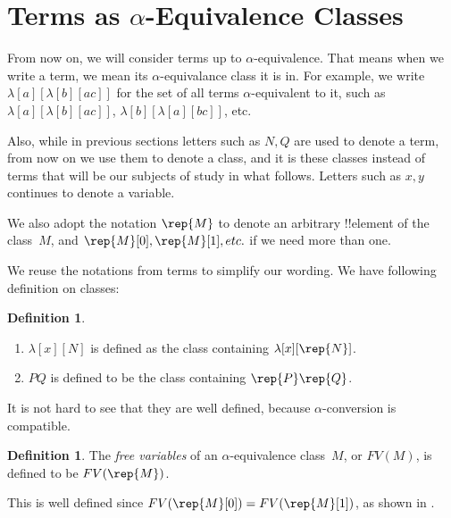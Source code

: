 \documentclass[10pt,a4paper]{article}
\makeatletter
\theoremstyle{plain}
\theoremstyle{definition}
\newtheorem{defn}[thm]{Definition}
\theoremstyle{remark}
\newcommand*{\olfileid}[3]{}
\newcommand*{\olsection}[1]{\section*{#1}}
\newcommand*{\olimport}[1]{}
\newcommand*{\ollabel}[1]{\label{#1}}
\newcommand{\olref}{\@ifnextchar[{\olref@i}{\olref@final}}
\def\olref@i[#1]{\@ifnextchar[{\olref@ii}{\olref@final}}
\def\olref@ii[#1]{\@ifnextchar[{\olref@iii}{\olref@final}}
\def\olref@iii[#1]{\olref@final}
\def\olref@final#1{\ref{#1}}
\providecommand{\lambd}{\ensuremath{\lambda}}
\makeatother
\begin{document}
\olimport{de-bruijn}

\olimport{term-revisited}

\olimport{beta}

\olimport{eta}

\OLEndChapterHook





\olfileid{lam}{syn}{tr}
\olsection{Terms as $\alpha$-Equivalence Classes}

From now on, we will consider terms up to $\alpha$-equivalence.  That
means when we write a term, we mean its $\alpha$-equivalance class it
is in. For example, we write $\lambd[a][\lambd[b][a c]]$ for the set
of all terms $\alpha$-equivalent to it, such as $\lambd[a][\lambd[b][a
    c]]$, $\lambd[b][\lambd[a][b c]]$, etc.

Also, while in previous sections letters such as $N, Q$ are used to
denote a term, from now on we use them to denote a class, and it is
these classes instead of terms that will be our subjects of study in
what follows. Letters such as $x, y$ continues to denote a variable.

We also adopt the notation $\rep{M}$ to denote an arbitrary
!!{element} of the class~$M$, and $\rep{M}[0], \rep{M}[1], etc. $ if
we need more than one.

We reuse the notations from terms to simplify our wording. We
have following definition on classes:
\begin{defn}
  \begin{enumerate}
  \item $\lambd[x][N]$ is defined as the class containing
    $\lambd[x][\rep{N}]$.
  \item $PQ$ is defined to be the class containing $\rep{P}\rep{Q}$.
  \end{enumerate}
\end{defn}

It is not hard to see that they are well defined, because
$\alpha$-conversion is compatible.

\begin{defn} \ollabel{def:fv}
  The \emph{free variables} of an $\alpha$-equivalence class~$M$, or
  $FV(M)$, is defined to be $FV(\rep{M})$.
\end{defn}

This is well defined since $FV(\rep{M}[0]) =
FV(\rep{M}[1])$, as shown in \olref[alp]{thm:fv}.
\end{document}
